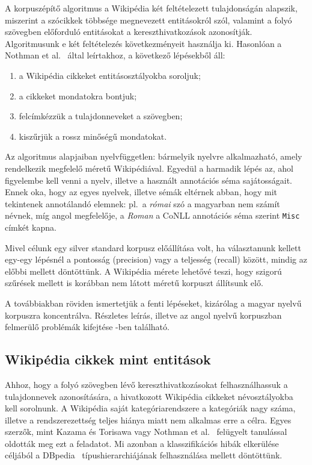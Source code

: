 \documentclass{llncs}
\begin{document}

A korpuszépítő algoritmus a Wikipédia két feltételezett tulajdonságán alapszik, miszerint a szócikkek többsége megnevezett entitásokról szól, valamint a folyó szövegben előforduló entitásokat a kereszthivatkozások azonosítják. Algoritmusunk e két feltételezés következményeit használja ki. Hasonlóan a Nothman et al.~\cite{Nothman:08} által leírtakhoz, a következő lépésekből áll:

\begin{enumerate}
\item a Wikipédia cikkeket entitásosztályokba soroljuk;
\item a cikkeket mondatokra bontjuk;
\item felcímkézzük a tulajdonneveket a szövegben;
\item kiszűrjük a rossz minőségű mondatokat.
\end{enumerate}

Az algoritmus alapjaiban nyelvfüggetlen: bármelyik nyelvre alkalmazható, amely
rendelkezik megfelelő méretű Wikipédiával. Egyedül a harmadik lépés az, ahol
figyelembe kell venni a nyelv, illetve a használt annotációs séma sajátosságait.
Ennek oka, hogy az egyes nyelvek, illetve sémák eltérnek abban, hogy
mit tekintenek annotálandó elemnek: pl.~a \textit{római} szó a magyarban nem
számít névnek, míg angol megfelelője, a \textit{Roman} a CoNLL annotációs séma
szerint \texttt{Misc} címkét kapna.

Mivel célunk egy silver standard korpusz előállítása volt, ha választanunk
kellett egy-egy lépésnél a pontosság (precision) vagy a teljesség (recall)
között, mindig az előbbi mellett döntöttünk. A Wikipédia mérete lehetővé teszi,
hogy szigorú szűrések mellett is korábban nem látott méretű korpuszt állítsunk elő.

A továbbiakban röviden ismertetjük a fenti lépéseket, kizárólag a magyar nyelvű korpuszra
koncentrálva. Részletes leírás, illetve az angol nyelvű korpuszban felmerülő
problémák kifejtése \cite{simon-nemeskey:2012:NEWS2012}-ben található.

\subsection{Wikipédia cikkek mint entitások}
\label{corpusbuilding:entities}

Ahhoz, hogy a folyó szövegben lévő kereszthivatkozásokat felhasználhassuk a
tulajdonnevek azonosítására, a hivatkozott Wikipédia cikkeket névosztályokba kell
sorolnunk. A Wikipédia saját kategóriarendszere a kategóriák nagy
száma, illetve a rendszerezettség teljes hiánya miatt nem alkalmas erre a célra. Egyes
szerzők, mint Kazama és Torisawa \cite{KaTo07} vagy Nothman et
al.~\cite{Nothman:08} felügyelt tanulással oldották meg ezt a feladatot. Mi
azonban a klasszifikációs hibák elkerülése céljából a DBpedia~\cite{Bizer:09}
típushierarchiájának felhasználása mellett döntöttünk.
\end{document}
